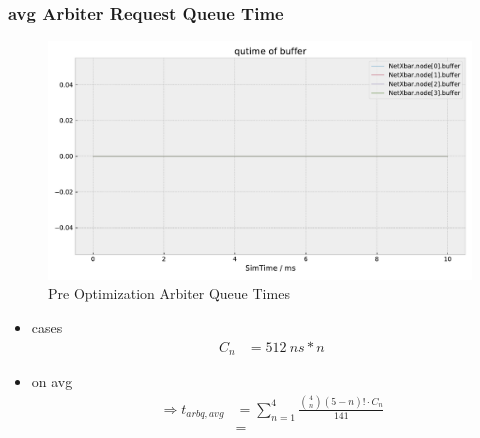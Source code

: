 \documentclass[]{scrartcl}
\begin{document}
    \subsubsection{avg Arbiter Request Queue Time}
        \begin{figure}[H]
            \centering
            \includegraphics[width=\columnwidth, page=7]{../../python/results/preopt-General-0}
            \caption{Pre Optimization Arbiter Queue Times}%
            \label{fig:preopt-arbiter-qtime}
        \end{figure}
        \begin{itemize}
            \item cases
                \begin{align}
                    C_n &= \SI{512}{ns} * n
                \end{align}
            \item on avg
                \begin{align}
                    \Rightarrow t_{arbq,avg} &= \sum_{n=1}^4 \frac{\binom{4}{n}\left( 5-n \right)! \cdot C_n }{141}\\
                                             &=
                \end{align}
        \end{itemize}
\end{document}
